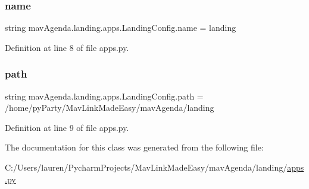 \subsubsection{\texorpdfstring{name}{name}}
{\footnotesize\ttfamily string mav\+Agenda.\+landing.\+apps.\+Landing\+Config.\+name = \textquotesingle{}landing\textquotesingle{}\hspace{0.3cm}{\ttfamily [static]}}



Definition at line 8 of file apps.\+py.

\mbox{\label{classmavAgenda_1_1landing_1_1apps_1_1LandingConfig_ac01cc3fd947a1b2ffe39349d73c2019c}} 
\subsubsection{\texorpdfstring{path}{path}}
{\footnotesize\ttfamily string mav\+Agenda.\+landing.\+apps.\+Landing\+Config.\+path = \textquotesingle{}/home/py\+Party/Mav\+Link\+Made\+Easy/mav\+Agenda/landing\textquotesingle{}\hspace{0.3cm}{\ttfamily [static]}}



Definition at line 9 of file apps.\+py.



The documentation for this class was generated from the following file\+:\begin{DoxyCompactItemize}
\item 
C\+:/\+Users/lauren/\+Pycharm\+Projects/\+Mav\+Link\+Made\+Easy/mav\+Agenda/landing/\mbox{\hyperlink{apps_8py}{apps.\+py}}\end{DoxyCompactItemize}
